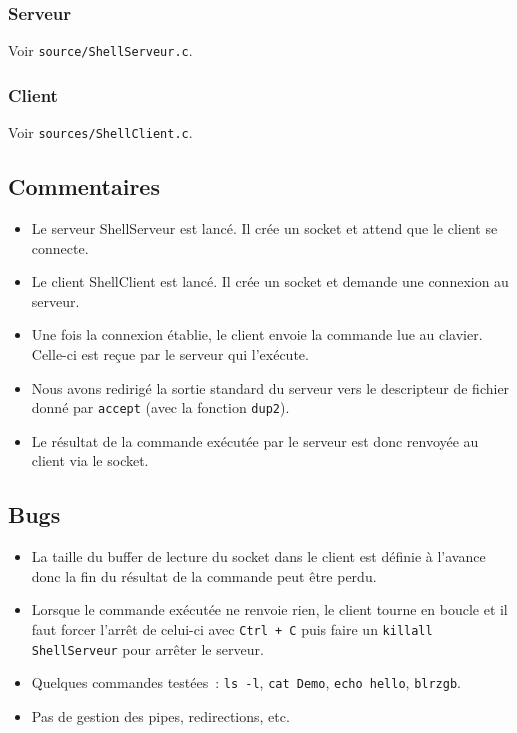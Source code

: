 \documentclass[french,10pt,a4paper]{article}
\begin{document}
\subsubsection{Serveur}
%
Voir \verb#source/ShellServeur.c#.

\subsubsection{Client}
%
Voir \verb#sources/ShellClient.c#.

\subsection{Commentaires}

\begin{itemize}
    \item Le serveur ShellServeur est lancé. Il crée un socket et attend que
        le client se connecte.
    \item Le client ShellClient est lancé. Il crée un socket et demande une
        connexion au serveur.
    \item Une fois la connexion établie, le client envoie la commande lue au
        clavier. Celle-ci est reçue par le serveur qui l'exécute.
    \item Nous avons redirigé la sortie standard du serveur vers le descripteur
        de fichier donné par \verb#accept# (avec la fonction \verb#dup2#).
    \item Le résultat de la commande exécutée par le serveur est donc renvoyée
        au client via le socket.
\end{itemize}

\subsection{Bugs}
\begin{itemize}
    \item La taille du buffer de lecture du socket dans le client est définie à
        l'avance donc la fin du résultat de la commande peut être perdu.
    \item Lorsque le commande exécutée ne renvoie rien, le client tourne en
        boucle et il faut forcer l'arrêt de celui-ci avec \verb#Ctrl + C# puis
        faire un \verb#killall ShellServeur# pour arrêter le serveur.
    \item Quelques commandes testées~: \verb#ls -l#, \verb#cat Demo#, \verb#echo hello#, \verb#blrzgb#.
    \item Pas de gestion des pipes, redirections, etc. 
\end{itemize}
\end{document}
